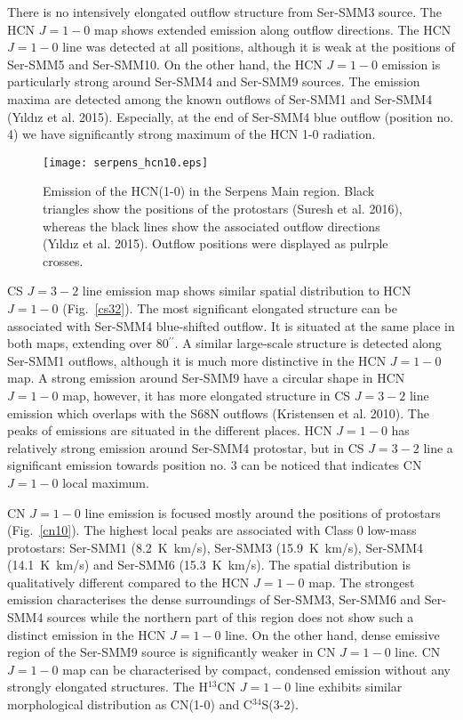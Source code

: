 \documentclass{aa}
\begin{document}
There is no intensively elongated outflow structure from Ser-SMM3 source. The HCN $J=1-0$ map shows extended emission along outflow directions. The HCN $J=1-0$ line was detected at all positions, although it is weak at the positions of Ser-SMM5 and Ser-SMM10. On the other hand, the HCN $J=1-0$ emission is particularly strong around Ser-SMM4 and Ser-SMM9 sources. The emission maxima are detected among the known outflows of Ser-SMM1 and Ser-SMM4 (Y{\i}ld{\i}z et al. 2015). Especially, at the end of Ser-SMM4 blue outflow (position no. 4) we have significantly strong maximum of the HCN 1-0 radiation. 

\begin{figure}
   \centering
   \texttt{[image: serpens\_hcn10.eps]}
      \caption{Emission of the HCN(1-0) in the Serpens Main region. Black triangles show the positions of the protostars (Suresh et al. 2016), whereas the black lines show the associated outflow directions (Y{\i}ld{\i}z et al. 2015). Outflow positions were displayed as pulrple crosses.}
         \label{hcn10}
   \end{figure}

CS $J=3-2$ line emission map shows similar spatial distribution to HCN $J=1-0$ (Fig.~\ref{cs32}). The most significant elongated structure can be associated with Ser-SMM4 blue-shifted outflow. It is situated at the same place in both maps, extending over 80$^{\prime\prime}$. A similar large-scale structure is detected along Ser-SMM1 outflows, although it is much more distinctive in the HCN $J=1-0$ map. A strong emission around Ser-SMM9 have a circular shape in HCN $J=1-0$ map, however, it has more elongated structure in CS $J=3-2$ line emission which overlaps with the S68N outflows (Kristensen et al. 2010). The peaks of emissions are situated in the different places. HCN $J=1-0$ has relatively strong emission around Ser-SMM4 protostar, but in CS $J=3-2$ line a significant emission towards position no. 3 can be noticed that indicates CN $J=1-0$ local maximum. 

CN $J=1-0$ line emission is focused mostly around the positions of protostars (Fig.~\ref{cn10}). 
The highest local peaks are associated with Class 0 low-mass protostars: Ser-SMM1 (8.2~K~km/s), Ser-SMM3 (15.9~K~km/s), Ser-SMM4 (14.1~K~km/s) and Ser-SMM6 (15.3~K~km/s). The spatial distribution is qualitatively different compared to the HCN $J=1-0$ map. The strongest emission characterises the dense surroundings of Ser-SMM3, Ser-SMM6 and Ser-SMM4 sources while the northern part of this region does not show such a distinct emission in the HCN $J=1-0$ line. On the other hand, dense emissive region of the Ser-SMM9 source is significantly weaker in CN $J=1-0$ line. CN $J=1-0$ map can be characterised by compact, condensed emission without any strongly elongated structures. The H$^{13}$CN $J=1-0$ line exhibits similar morphological distribution as CN(1-0) and \mbox{C$^{34}$S(3-2)}. 
\end{document}

